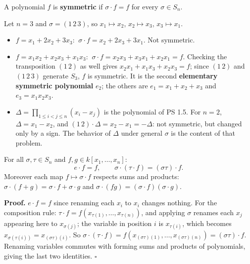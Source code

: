 \documentclass[11pt]{report}
\renewenvironment{proof}[1][Proof]{\noindent\textbf{#1.} }{\hfill$\square$\par\vspace{5pt}}
\begin{document}
\begin{defbox}\label{def:symmetric-polynomial}
A polynomial $f$ is \textbf{symmetric} if $\sigma \cdot f = f$ for every $\sigma \in S_n$.
\end{defbox}

\begin{exbox}\label{ex:permuting-variables}
Let $n = 3$ and $\sigma = (1\,2\,3)$, so $x_1 \mapsto x_2$, $x_2 \mapsto x_3$, $x_3 \mapsto x_1$.
\begin{itemize}[nosep]
    \item $f = x_1 + 2x_2 + 3x_3$: $\ \sigma \cdot f = x_2 + 2x_3 + 3x_1$. Not symmetric.
    \item $f = x_1 x_2 + x_2 x_3 + x_1 x_3$: $\ \sigma \cdot f = x_2 x_3 + x_3 x_1 + x_2 x_1 = f$. Checking the transposition $(1\,2)$ as well gives $x_2 x_1 + x_1 x_3 + x_2 x_3 = f$; since $(1\,2)$ and $(1\,2\,3)$ generate $S_3$, $f$ is symmetric. It is the second \textbf{elementary symmetric polynomial} $e_2$; the others are $e_1 = x_1 + x_2 + x_3$ and $e_3 = x_1 x_2 x_3$.
    \item $\Delta = \prod_{1 \leq i < j \leq n}(x_i - x_j)$ is the polynomial of PS 1.5. For $n = 2$, $\Delta = x_1 - x_2$, and $(1\,2) \cdot \Delta = x_2 - x_1 = -\Delta$: not symmetric, but changed only by a sign. The behavior of $\Delta$ under general $\sigma$ is the content of that problem.
\end{itemize}
\end{exbox}

\begin{propbox}\label{prop:compatibility-action-composition}
For all $\sigma, \tau \in S_n$ and $f, g \in k[x_1, \ldots, x_n]$:
\[ e \cdot f = f, \qquad \sigma \cdot (\tau \cdot f) = (\sigma\tau) \cdot f. \]
Moreover each map $f \mapsto \sigma \cdot f$ respects sums and products: $\sigma \cdot (f + g) = \sigma \cdot f + \sigma \cdot g$ and $\sigma \cdot (fg) = (\sigma \cdot f)(\sigma \cdot g)$.
\end{propbox}

\begin{proof}
$e \cdot f = f$ since renaming each $x_i$ to $x_i$ changes nothing. For the composition rule: $\tau \cdot f = f(x_{\tau(1)}, \ldots, x_{\tau(n)})$, and applying $\sigma$ renames each $x_j$ appearing here to $x_{\sigma(j)}$; the variable in position $i$ is $x_{\tau(i)}$, which becomes $x_{\sigma(\tau(i))} = x_{(\sigma\tau)(i)}$. So $\sigma \cdot (\tau \cdot f) = f(x_{(\sigma\tau)(1)}, \ldots, x_{(\sigma\tau)(n)}) = (\sigma\tau) \cdot f$. Renaming variables commutes with forming sums and products of polynomials, giving the last two identities.
\end{proof}
\end{document}
